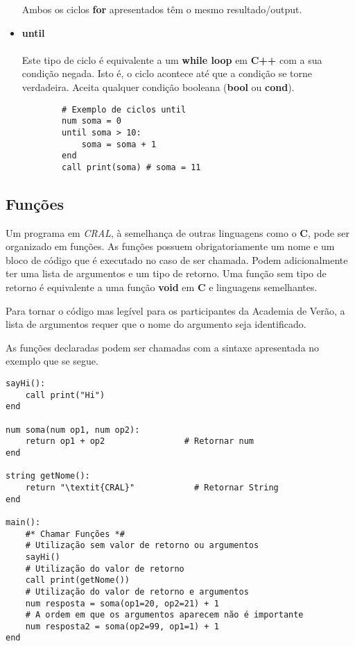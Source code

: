 \documentclass{report}
\begin{document}
\begin{itemize}
    Ambos os ciclos \textbf{for} apresentados têm o mesmo resultado/output.
    \item \textbf{until}\\
    \\ Este tipo de ciclo é equivalente a um \textbf{while loop} em \textbf{C++} com a sua condição negada. Isto é, o ciclo acontece até que a condição se torne verdadeira. Aceita qualquer condição booleana (\textbf{bool} ou \textbf{cond}).
    \begin{verbatim}
        # Exemplo de ciclos until
        num soma = 0
        until soma > 10:
            soma = soma + 1
        end
        call print(soma) # soma = 11
    \end{verbatim}
\end{itemize}

\subsection{Funções}

Um programa em \textit{CRAL}, à semelhança de outras linguagens como o \textbf{C}, pode ser organizado em funções.
As funções possuem obrigatoriamente um nome e um bloco de código que é executado no caso de ser chamada. Podem adicionalmente ter uma lista de argumentos e um tipo de retorno. 
Uma função sem tipo de retorno é equivalente a uma função \textbf{void} em \textbf{C} e linguagens semelhantes.

Para tornar o código mas legível para os participantes da Academia de Verão, a lista de argumentos requer que o nome do argumento seja identificado. 

As funções declaradas podem ser chamadas com a sintaxe apresentada no exemplo que se segue.

\begin{verbatim}
sayHi():
    call print("Hi")
end

num soma(num op1, num op2):
    return op1 + op2                # Retornar num
end

string getNome():
    return "\textit{CRAL}"            # Retornar String
end

main():
    #* Chamar Funções *#
    # Utilização sem valor de retorno ou argumentos
    sayHi()
    # Utilização do valor de retorno
    call print(getNome())
    # Utilização do valor de retorno e argumentos
    num resposta = soma(op1=20, op2=21) + 1
    # A ordem em que os argumentos aparecem não é importante
    num resposta2 = soma(op2=99, op1=1) + 1
end
\end{verbatim}
\end{document}

